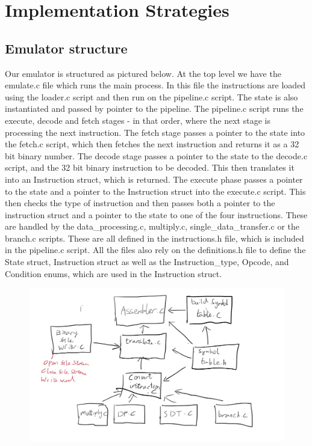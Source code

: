 \documentclass[11pt]{article}
\begin{document}
  \section*{Implementation Strategies}

  \subsection*{Emulator structure}

Our emulator is structured as pictured below. At the top level we have the emulate.c file which runs the main process. In this file the instructions are loaded using the loader.c script and then run on the pipeline.c script. The state is also instantiated and passed by pointer to the pipeline. The pipeline.c script runs the execute, decode and fetch stages - in that order, where the next stage is processing the next instruction. The fetch stage passes a pointer to the state into the fetch.c script, which then fetches the next instruction and returns it as a 32 bit binary number. The decode stage passes a pointer to the state to the decode.c script, and the 32 bit binary instruction to be decoded. This then translates it into an Instruction struct, which is returned. The execute phase passes a pointer to the state and a pointer to the Instruction struct into the execute.c script. This then checks the type of instruction and then passes both a pointer to the instruction struct and a pointer to the state to one of the four instructions. These are handled by the data_processing.c, multiply.c, single_data_transfer.c or the branch.c scripts. These are all defined in the instructions.h file, which is included in the pipeline.c script. All the files also rely on the definitions.h file to define the State struct, Instruction struct as well as the Instruction_type, Opcode, and Condition enums, which are used in the Instruction struct.

 \begin{figure}[h]
 \includegraphics[scale=0.4]{emulate_structure}
 \centering
 \end{figure}

  
\end{document}
